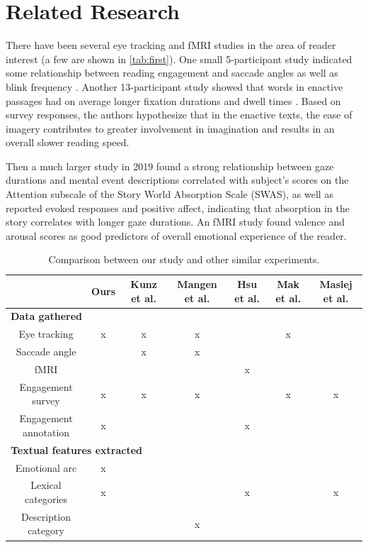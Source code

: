 \documentclass[11pt]{article}
\begin{document}
\section{Related Research}
There have been several eye tracking and fMRI studies in the area of reader interest (a few are shown in \autoref{tab:first}). One small 5-participant study indicated some relationship between reading engagement and saccade angles as well as blink frequency \citep{kunze2015}. Another 13-participant study showed that words in enactive passages had on average longer fixation durations and dwell times \citep{Magyari2020}. Based on survey responses, the authors hypothesize that in the enactive texts, the ease of imagery contributes to greater involvement in imagination and results in an overall slower reading speed.

Then a much larger study in 2019 found a strong relationship between gaze durations and mental event descriptions correlated with subject’s scores on the Attention subscale of the Story World Absorption Scale (SWAS), as well as reported evoked responses and positive affect, indicating that absorption in the story correlates with longer gaze durations. An fMRI study found valence and arousal scores as good predictors of overall emotional experience of the reader. 


\begin{table}[t]
\centering
\begin{tabular}{|c|c|c|c|c|c|c|}
\hline
& \textbf{Ours} & \textbf{Kunz et al.} & \textbf{Mangen et al.} & \textbf{Hsu et al.} & \textbf{Mak et al.} & \textbf{Maslej et al.} \\
\hline
\multicolumn{7}{|l|}{\textbf{Data gathered}}\\\hline
Eye tracking & x & x & x &  & x &  \\\hline
Saccade angle &  & x & x &  &  & \\\hline
fMRI &  &  &  & x &  & \\\hline
Engagement survey & x & x & x &  & x & x\\\hline
Engagement annotation & x &  &  & x &  & \\\hline
\multicolumn{7}{|l|}{\textbf{Textual features extracted}}\\\hline
Emotional arc & x &  &  &  &  & \\\hline
Lexical categories & x &  &  & x &  & x\\\hline
Description category &  &  & x &  &  & \\\hline

\end{tabular}
\caption{Comparison between our study and other similar experiments.}
\label{tab:first}
\end{table}
\end{document}
